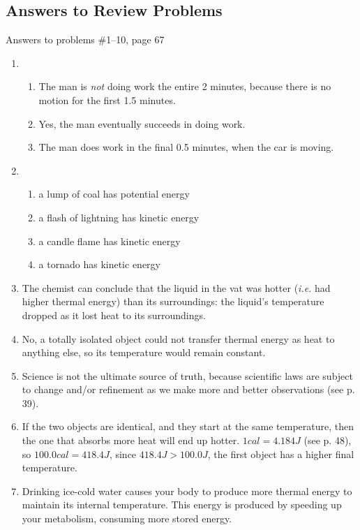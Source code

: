 \documentclass[11pt, oneside]{article}   	%
\begin{document}
\pagebreak
\subsection{Answers to Review Problems}
Answers to problems \#1--10, page 67

\begin{enumerate}
\item
\begin{enumerate}
\item The man is \emph{not} doing work the entire 2 minutes, because there is no motion for the first 1.5 minutes.
\item Yes, the man eventually succeeds in doing work.
\item The man does work in the final 0.5 minutes, when the car is moving.
\end{enumerate}

\item
\begin{enumerate}
\item a lump of coal has potential energy
\item a flash of lightning has kinetic energy 
\item a candle flame has kinetic energy
\item a tornado has kinetic energy
\end{enumerate}

\item The chemist can conclude that the liquid in the vat was hotter (\emph{i.e.} had higher thermal energy) than its surroundings: the liquid's temperature dropped as it lost heat to its surroundings.

\item No, a totally isolated object could not transfer thermal energy as heat to anything else, so its temperature would remain constant.

\item Science is not the ultimate source of truth, because scientific laws are subject to change and/or refinement as we make more and better observations (see p. 39).

\item If the two objects are identical, and they start at the same temperature, then the one that absorbs more heat will end up hotter. $ 1 cal = 4.184 J $ (see p. 48), so $ 100.0 cal = 418.4 J $, since $ 418.4 J > 100.0 J $, the first object has a higher final temperature.  

\item Drinking ice-cold water causes your body to produce more thermal energy to maintain its internal temperature. This energy is produced by speeding up your metabolism, consuming more stored energy.


\end{enumerate}
\end{document}
